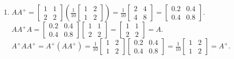 \begin{enumerate}[label=(\alph*)]
    \item $A A^+ = \begin{bmatrix} 1 & 1 \\ 2 & 2 \end{bmatrix} \left(\frac{1}{10}\begin{bmatrix} 1 & 2 \\ 1 & 2 \end{bmatrix}\right) = \frac{1}{10}\begin{bmatrix} 2 & 4 \\ 4 & 8 \end{bmatrix} = \begin{bmatrix} 0.2 & 0.4 \\ 0.4 & 0.8 \end{bmatrix}$.
    $A A^+ A = \begin{bmatrix} 0.2 & 0.4 \\ 0.4 & 0.8 \end{bmatrix} \begin{bmatrix} 1 & 1 \\ 2 & 2 \end{bmatrix} = \begin{bmatrix} 1 & 1 \\ 2 & 2 \end{bmatrix} = A$.
    $A^+ A A^+ = A^+ (A A^+) = \frac{1}{10}\begin{bmatrix} 1 & 2 \\ 1 & 2 \end{bmatrix} \begin{bmatrix} 0.2 & 0.4 \\ 0.4 & 0.8 \end{bmatrix} = \frac{1}{10}\begin{bmatrix} 1 & 2 \\ 1 & 2 \end{bmatrix} = A^+$.
\end{enumerate}

